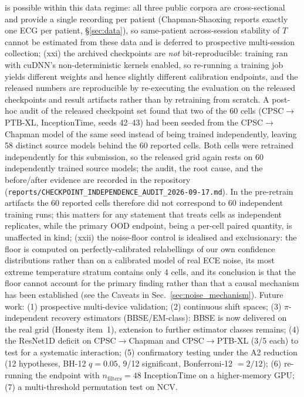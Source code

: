 \documentclass[review,12pt,nonatbib]{elsarticle}
\begin{document}
is possible within this data regime: all three public corpora are
cross-sectional and provide a single recording per patient
(Chapman-Shaoxing reports exactly one ECG per patient, \S\ref{sec:data}),
so same-patient across-session stability of $T$ cannot be estimated from
these data and is deferred to prospective multi-session collection;
(xxi) the archived checkpoints are \emph{not} bit-reproducible: training
ran with cuDNN's non-deterministic kernels enabled, so re-running a
training job yields different weights and hence slightly different
calibration endpoints, and the released numbers are reproducible by
re-executing the evaluation on the released checkpoints and result
artifacts rather than by retraining from scratch. A post-hoc audit of the
released checkpoint set found that two of the 60 cells
(CPSC$\rightarrow$PTB-XL, InceptionTime, seeds 42--43) had been seeded
from the CPSC$\rightarrow$Chapman model of the same seed instead of being
trained independently, leaving 58 distinct source models behind the 60
reported cells. Both cells were retrained independently for this
submission, so the released grid again rests on 60 independently trained
source models; the audit, the root cause, and the before/after evidence
are recorded in the repository
(\texttt{reports/CHECKPOINT\_INDEPENDENCE\_AUDIT\_2026-09-17.md}). In the
pre-retrain artifacts the 60 reported cells therefore did not correspond
to 60 independent training runs; this matters for any statement that
treats cells as independent replicates, while the primary OOD endpoint,
being a per-cell paired quantity, is unaffected in kind; (xxii) the
noise-floor control is idealised and exclusionary: the floor is computed
on perfectly-calibrated relabellings of our own confidence
distributions rather than on a calibrated model of real ECE noise, its
most extreme temperature stratum contains only 4 cells, and its
conclusion is that the floor cannot account for the primary finding
rather than that a causal mechanism has been established (see the
Caveats in Sec.~\ref{sec:noise_mechanism}).
Future work:
(1) prospective multi-device validation; (2) continuous shift spaces;
(3) $\pi$-independent recovery estimators (BBSE/EM-class): BBSE is now
delivered on the real grid (Honesty item~1), extension to further
estimator classes remains; (4) the ResNet1D deficit on
CPSC$\rightarrow$Chapman and CPSC$\rightarrow$PTB-XL (3/5 each) to test
for a systematic interaction; (5) confirmatory testing under the A2
reduction (12 hypotheses, BH-12 $q=0.05$, 9/12 significant,
Bonferroni-12 $=2/12$); (6) re-running the endpoint with
$n_{\text{filters}}=48$ InceptionTime on a higher-memory GPU; (7) a
multi-threshold permutation test on NCV.
\end{document}
